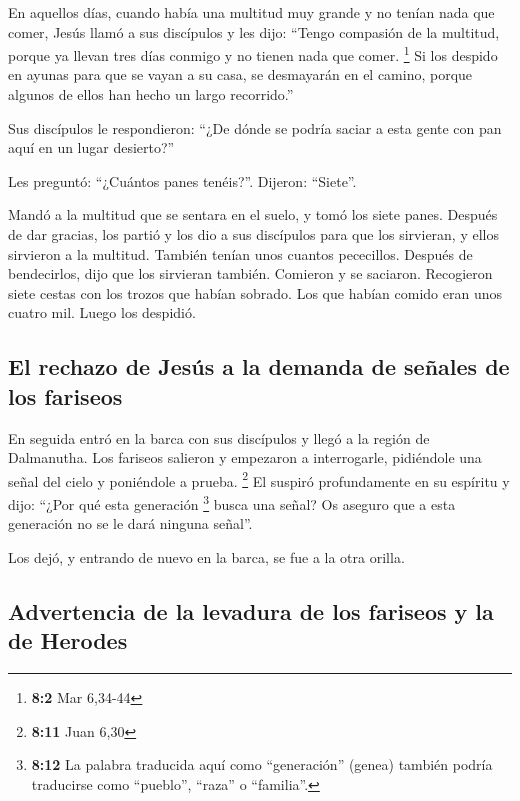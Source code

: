 \begin{paracol}{2}
 En aquellos días, cuando había una multitud muy grande y
no tenían nada que comer, Jesús llamó a sus discípulos y les dijo:
 ``Tengo compasión de la multitud, porque ya llevan tres
días conmigo y no tienen nada que comer. \footnote{\textbf{8:2} Mar
  6,34-44}  Si los despido en ayunas para que se vayan a
su casa, se desmayarán en el camino, porque algunos de ellos han hecho
un largo recorrido.''

 Sus discípulos le respondieron: ``¿De dónde se podría
saciar a esta gente con pan aquí en un lugar desierto?''

 Les preguntó: ``¿Cuántos panes tenéis?''. Dijeron:
``Siete''.

 Mandó a la multitud que se sentara en el suelo, y tomó
los siete panes. Después de dar gracias, los partió y los dio a sus
discípulos para que los sirvieran, y ellos sirvieron a la multitud.
 También tenían unos cuantos pececillos. Después de
bendecirlos, dijo que los sirvieran también.  Comieron y
se saciaron. Recogieron siete cestas con los trozos que habían sobrado.
 Los que habían comido eran unos cuatro mil. Luego los
despidió.

\hypertarget{el-rechazo-de-jesuxfas-a-la-demanda-de-seuxf1ales-de-los-fariseos}{%
\subsection{El rechazo de Jesús a la demanda de señales de los
fariseos}\label{el-rechazo-de-jesuxfas-a-la-demanda-de-seuxf1ales-de-los-fariseos}}

 En seguida entró en la barca con sus discípulos y llegó
a la región de Dalmanutha.  Los fariseos salieron y
empezaron a interrogarle, pidiéndole una señal del cielo y poniéndole a
prueba. \footnote{\textbf{8:11} Juan 6,30}  El suspiró
profundamente en su espíritu y dijo: ``¿Por qué esta generación
\footnote{\textbf{8:12} La palabra traducida aquí como ``generación''
  (genea) también podría traducirse como ``pueblo'', ``raza'' o
  ``familia''.} busca una señal? Os aseguro que a esta generación no se
le dará ninguna señal''.

 Los dejó, y entrando de nuevo en la barca, se fue a la
otra orilla.

\hypertarget{advertencia-de-la-levadura-de-los-fariseos-y-la-de-herodes}{%
\subsection{Advertencia de la levadura de los fariseos y la de
Herodes}\label{advertencia-de-la-levadura-de-los-fariseos-y-la-de-herodes}}


\end{paracol}
